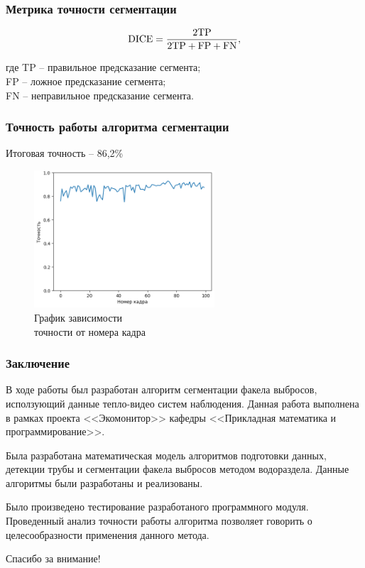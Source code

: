 \documentclass[t]{beamer}
\begin{document}
	\begin{frame}
		\frametitle{Метрика точности сегментации}
		\vspace{0.5cm}
		\begin{equation}
			\textup{DICE} = \frac{2\textup{TP}}{2\textup{TP} + \textup{FP} + \textup{FN}},
			\label{eq:DiceLoss}		\vspace{0.3cm}
		\end{equation}

		где TP -- правильное предсказание сегмента;\\ \hfill \break
		\hspace*{0.65cm}FP -- ложное предсказание сегмента;\\ \hfill \break
		\hspace*{0.65cm}FN -- неправильное предсказание сегмента.
	\end{frame}

	\begin{frame}
		\frametitle{Точность работы алгоритма сегментации}
		Итоговая точность -- 86,2\%
		\vspace*{0.25cm}
		\begin{figure}[h!]
			\centering
			\includegraphics[width = 0.6\textwidth]{image/accuracy_itog_plot}	
			\caption{График зависимости\\ точности от номера кадра}
			\label{fig:accuracy_itog_plot}
		\end{figure}
	\end{frame}

	\begin{frame}
		\frametitle{Заключение}
		В ходе работы был разработан алгоритм сегментации факела выбросов, исползующий данные тепло-видео систем наблюдения. Данная работа выполнена в рамках проекта <<Экомонитор>> кафедры <<Прикладная математика и программирование>>.
		
		\vspace{0.2cm}
		
		Была разработана математическая модель алгоритмов подготовки данных, детекции трубы и сегментации факела выбросов методом водораздела. Данные алгоритмы были разработаны и реализованы.
		
		\vspace{0.2cm}
		
		Было произведено тестирование разработаного программного модуля. Проведенный анализ точности работы алгоритма позволяет говорить о целесообразности применения данного метода.
	\end{frame}

	\begin{frame}
		\vspace{2.9cm}
		\begin{center}{\Huge{Спасибо за внимание!}}\end{center}
	\end{frame}
\end{document}

